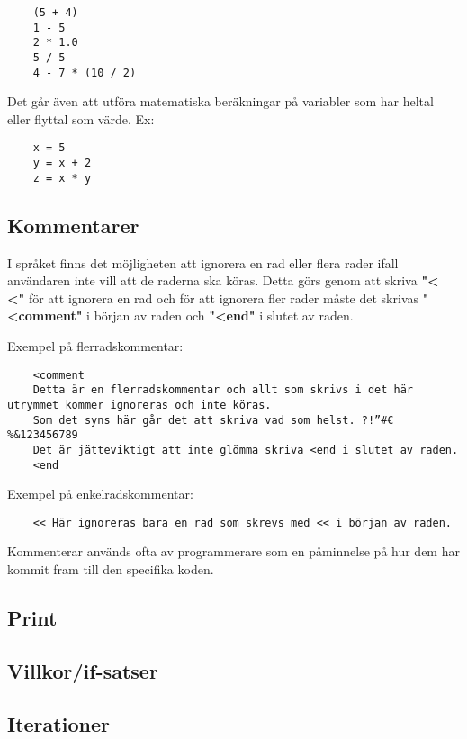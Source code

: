 \documentclass{TDP019mall}
\begin{document}
\begin{verbatim}
    (5 + 4)
    1 - 5
    2 * 1.0
    5 / 5
    4 - 7 * (10 / 2)
\end{verbatim}

Det går även att utföra matematiska beräkningar på variabler som har heltal eller flyttal som värde. Ex:
\begin{verbatim}
    x = 5
    y = x + 2
    z = x * y
\end{verbatim}

\subsection{Kommentarer}
I språket finns det möjligheten att ignorera en rad eller flera rader ifall användaren inte vill att de raderna ska köras. 
Detta görs genom att skriva \textbf{"< <"} för att ignorera en rad och för att ignorera fler rader måste det skrivas 
\textbf{"<comment"} i början av raden och \textbf{"<end"} i slutet av raden.

Exempel på flerradskommentar:
\begin{verbatim}
    <comment 
    Detta är en flerradskommentar och allt som skrivs i det här utrymmet kommer ignoreras och inte köras. 
    Som det syns här går det att skriva vad som helst. ?!”#€%&123456789
    Det är jätteviktigt att inte glömma skriva <end i slutet av raden.
    <end
\end{verbatim}
 
Exempel på enkelradskommentar:
\begin{verbatim}
    << Här ignoreras bara en rad som skrevs med << i början av raden.
\end{verbatim}
 
Kommenterar används ofta av programmerare som en påminnelse på hur dem har kommit fram till den specifika koden.
 


\subsection{Print}

\subsection{Villkor/if-satser}

\subsection{Iterationer}
\end{document}
